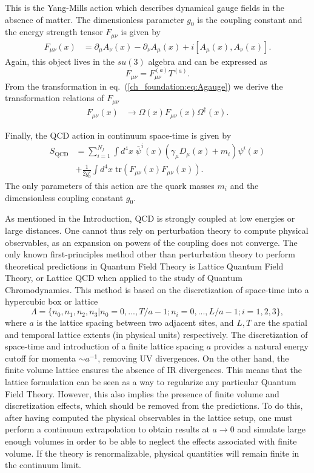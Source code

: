 This is the Yang-Mills action which describes dynamical gauge fields in the absence of matter. The dimensionless parameter $g_0$ is the coupling constant and the energy strength tensor $F_{\mu\nu}$ is given by
\begin{align}
F_{\mu\nu}(x)&=\partial_{\mu}A_{\nu}(x)-\partial_{\nu}A_{\mu}(x)+i\left[A_{\mu}(x),A_{\nu}(x)\right].
\end{align}
Again, this object lives in the $su(3)$ algebra and can be expressed as
\begin{equation}
F_{\mu\nu}=F_{\mu\nu}^{(a)}T^{(a)}.
\end{equation}
From the transformation in eq.~(\ref{ch_foundation:eq:Agauge}) we derive the transformation relations of $F_{\mu\nu}$
\begin{align}
F_{\mu\nu}(x)&\to\Omega(x)F_{\mu\nu}(x)\Omega^{\dagger}(x).
\end{align}

Finally, the QCD action in continuum space-time is given by 
\begin{align}
\label{ch_foundation:eq:QCD}
S_{\textrm{QCD}}&=\sum_{i=1}^{N_f}\int d^4x\;\bar{\psi}^i(x)\left(\gamma_{\mu}D_{\mu}(x)+m_i\right)\psi^i(x) \\
&+\frac{1}{2g_0^2}\int d^4x\;{\textrm{tr}}\left(F_{\mu\nu}(x)F_{\mu\nu}(x)\right).
\end{align}
The only parameters of this action are the quark masses $m_i$ and the dimensionless coupling constant $g_0$.

As mentioned in the Introduction, QCD is strongly coupled at low energies or large distances. One cannot thus rely on perturbation theory to compute physical observables, as an expansion on powers of the coupling does not converge. The only known first-principles method other than perturbation theory to perform theoretical predictions in Quantum Field Theory is Lattice Quantum Field Theory, or Lattice QCD when applied to the study of Quantum Chromodynamics. This method is based on the discretization of space-time into a hypercubic box or lattice
\begin{equation}
\Lambda=\{n_0,n_1,n_2,n_3|n_0=0,...,T/a-1;n_i=0,...,L/a-1;i=1,2,3\},
\end{equation} 
where $a$ is the lattice spacing between two adjacent sites, and $L,T$ are the spatial and temporal lattice extents (in physical units) respectively. The discretization of space-time and introduction of a finite lattice spacing $a$ provides a natural energy cutoff for momenta $\sim a^{-1}$, removing UV divergences. On the other hand, the finite volume lattice ensures the absence of IR divergences. This means that the lattice formulation can be seen as a way to regularize any particular Quantum Field Theory. However, this also implies the presence of finite volume and discretization effects, which should be removed from the predictions. To do this, after having computed the physical observables in the lattice setup, one must perform a continuum extrapolation to obtain results at $a\rightarrow0$ and simulate large enough volumes in order to be able to neglect the effects associated with finite volume. If the theory is renormalizable, physical quantities will remain finite in the continuum limit.

